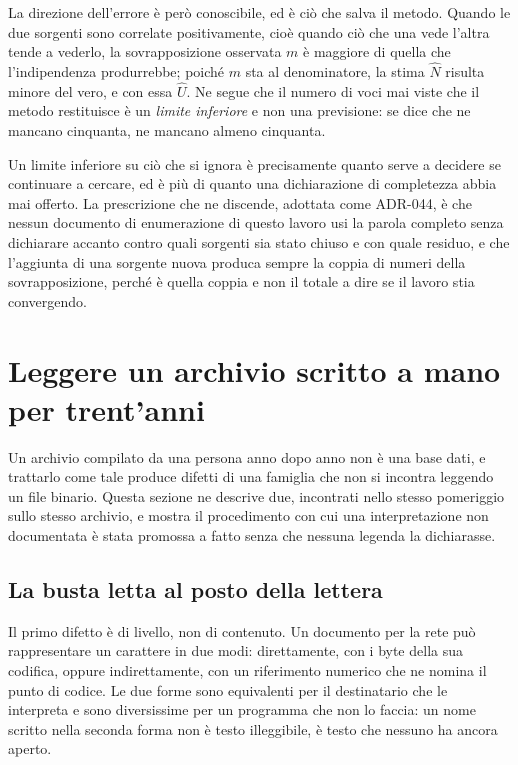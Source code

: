 La direzione dell'errore è però conoscibile, ed è ciò che salva il metodo. Quando le due sorgenti sono correlate positivamente, cioè quando ciò che una vede l'altra tende a vederlo, la sovrapposizione osservata $m$ è maggiore di quella che l'indipendenza produrrebbe; poiché $m$ sta al denominatore, la stima $\hat{N}$ risulta minore del vero, e con essa $\hat{U}$. Ne segue che il numero di voci mai viste che il metodo restituisce è un \emph{limite inferiore} e non una previsione: se dice che ne mancano cinquanta, ne mancano almeno cinquanta.

Un limite inferiore su ciò che si ignora è precisamente quanto serve a decidere se continuare a cercare, ed è più di quanto una dichiarazione di completezza abbia mai offerto. La prescrizione che ne discende, adottata come ADR-044, è che nessun documento di enumerazione di questo lavoro usi la parola completo senza dichiarare accanto contro quali sorgenti sia stato chiuso e con quale residuo, e che l'aggiunta di una sorgente nuova produca sempre la coppia di numeri della sovrapposizione, perché è quella coppia e non il totale a dire se il lavoro stia convergendo.

\section{Leggere un archivio scritto a mano per trent'anni}
\label{sec:archivio-umano}

Un archivio compilato da una persona anno dopo anno non è una base dati, e trattarlo come tale produce difetti di una famiglia che non si incontra leggendo un file binario. Questa sezione ne descrive due, incontrati nello stesso pomeriggio sullo stesso archivio, e mostra il procedimento con cui una interpretazione non documentata è stata promossa a fatto senza che nessuna legenda la dichiarasse.

\subsection{La busta letta al posto della lettera}

Il primo difetto è di livello, non di contenuto. Un documento per la rete può rappresentare un carattere in due modi: direttamente, con i byte della sua codifica, oppure indirettamente, con un riferimento numerico che ne nomina il punto di codice. Le due forme sono equivalenti per il destinatario che le interpreta e sono diversissime per un programma che non lo faccia: un nome scritto nella seconda forma non è testo illeggibile, è testo che nessuno ha ancora aperto.

